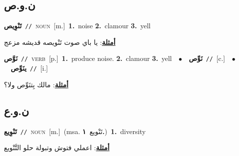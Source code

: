 \documentclass[10pt,a4paper,twoside]{article} %
\begin{document}
\begin{multicols}{2}
\vspace{-3mm}
\subsection*{\color{blue}\foreignlanguage{arabic}{ن.و.ص}\color{blue}{}} 

{\setlength\topsep{0pt}\textbf{\foreignlanguage{arabic}{تَنْوِيص}}\ {\color{gray}\texttt{//}\color{black}}\ \textsc{noun}\ [m.]\ \textbf{1.}~noise  \textbf{2.}~clamour  \textbf{3.}~yell\  \begin{flushright}\color{gray}\foreignlanguage{arabic}{\textbf{\underline{\foreignlanguage{arabic}{أمثلة}}}: يا باي صوت تَنْويصه قديشه مزعج}\end{flushright}\color{black}} \vspace{2mm}

{\setlength\topsep{0pt}\textbf{\foreignlanguage{arabic}{نَوَّص}}\ {\color{gray}\texttt{//}\color{black}}\ \textsc{verb}\ [p.]\ \textbf{1.}~produce noise.  \textbf{2.}~clamour  \textbf{3.}~yell\ \ $\bullet$\ \ \setlength\topsep{0pt}\textbf{\foreignlanguage{arabic}{نَوِّص}}\ {\color{gray}\texttt{//}\color{black}}\ [c.]\ \ $\bullet$\ \ \setlength\topsep{0pt}\textbf{\foreignlanguage{arabic}{ينَوِّص}}\ {\color{gray}\texttt{//}\color{black}}\ [i.]\  \begin{flushright}\color{gray}\foreignlanguage{arabic}{\textbf{\underline{\foreignlanguage{arabic}{أمثلة}}}: مالك بِتنَوِّص ولا؟}\end{flushright}\color{black}} \vspace{2mm}

\vspace{-3mm}
\subsection*{\color{blue}\foreignlanguage{arabic}{ن.و.ع}\color{blue}{}} 

{\setlength\topsep{0pt}\textbf{\foreignlanguage{arabic}{تَنْوِيع}}\ {\color{gray}\texttt{//}\color{black}}\ \textsc{noun}\ [m.]\ \color{gray}(msa. \foreignlanguage{arabic}{تَنْويع}~\foreignlanguage{arabic}{\textbf{١.}})\color{black}\ \textbf{1.}~diversity\  \begin{flushright}\color{gray}\foreignlanguage{arabic}{\textbf{\underline{\foreignlanguage{arabic}{أمثلة}}}: اعملي فتوش وتبولة حلو التَّنْويع}\end{flushright}\color{black}} \vspace{2mm}


\end{multicols}
\end{document}
